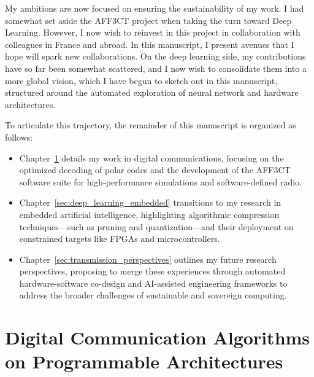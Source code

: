 \documentclass[11pt]{report}
\begin{document}
My ambitions are now focused on ensuring the sustainability of my work. I had somewhat set aside the AFF3CT project when taking the turn toward Deep Learning. However, I now wish to reinvest in this project in collaboration with colleagues in France and abroad. In this manuscript, I present avenues that I hope will spark new collaborations. On the deep learning side, my contributions have so far been somewhat scattered, and I now wish to consolidate them into a more global vision, which I have begun to sketch out in this manuscript, structured around the automated exploration of neural network and hardware architectures.


To articulate this trajectory, the remainder of this manuscript is organized as follows:
\begin{itemize}
    \item Chapter~\ref{sec:chaines_communication} details my work in digital communications, focusing on the optimized decoding of polar codes and the development of the AFF3CT software suite for high-performance simulations and software-defined radio.

    \item Chapter~\ref{sec:deep_learning_embedded} transitions to my research in embedded artificial intelligence, highlighting algorithmic compression techniques—such as pruning and quantization—and their deployment on constrained targets like FPGAs and microcontrollers.

    \item Chapter~\ref{sec:transmission_perspectives} outlines my future research perspectives, proposing to merge these experiences through automated hardware-software co-design and AI-assisted engineering frameworks to address the broader challenges of sustainable and sovereign computing.

\end{itemize}


\pagebreak

\minitoc
\vspace{1cm}


\chapter{Digital Communication Algorithms on Programmable Architectures}
\label{sec:chaines_communication}
\end{document}
